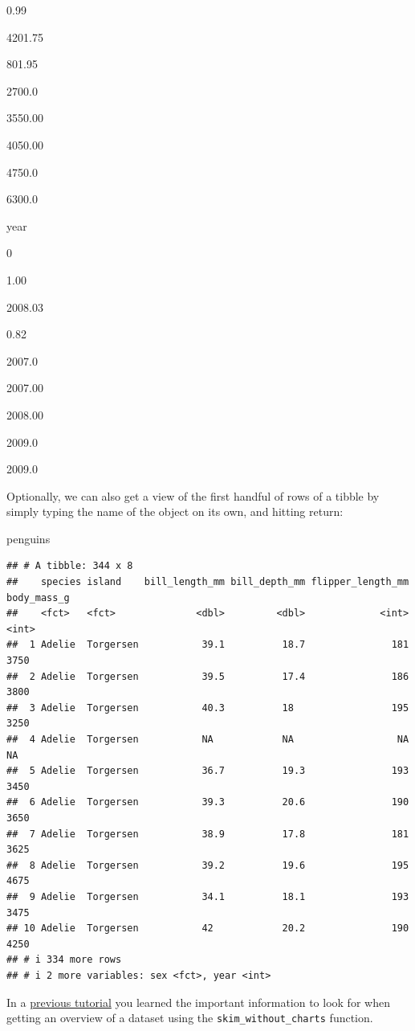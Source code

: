 \documentclass[
]{book}
\newenvironment{Shaded}{\begin{snugshade}}{\end{snugshade}}
\newcommand{\NormalTok}[1]{#1}
\begin{document}
0.99

4201.75

801.95

2700.0

3550.00

4050.00

4750.0

6300.0

year

0

1.00

2008.03

0.82

2007.0

2007.00

2008.00

2009.0

2009.0

Optionally, we can also get a view of the first handful of rows of a tibble by simply typing the name of the object on its own, and hitting return:

\begin{Shaded}
\begin{Highlighting}[]
\NormalTok{penguins }
\end{Highlighting}
\end{Shaded}

\begin{verbatim}
## # A tibble: 344 x 8
##    species island    bill_length_mm bill_depth_mm flipper_length_mm body_mass_g
##    <fct>   <fct>              <dbl>         <dbl>             <int>       <int>
##  1 Adelie  Torgersen           39.1          18.7               181        3750
##  2 Adelie  Torgersen           39.5          17.4               186        3800
##  3 Adelie  Torgersen           40.3          18                 195        3250
##  4 Adelie  Torgersen           NA            NA                  NA          NA
##  5 Adelie  Torgersen           36.7          19.3               193        3450
##  6 Adelie  Torgersen           39.3          20.6               190        3650
##  7 Adelie  Torgersen           38.9          17.8               181        3625
##  8 Adelie  Torgersen           39.2          19.6               195        4675
##  9 Adelie  Torgersen           34.1          18.1               193        3475
## 10 Adelie  Torgersen           42            20.2               190        4250
## # i 334 more rows
## # i 2 more variables: sex <fct>, year <int>
\end{verbatim}

In a \hyperref[data_overview]{previous tutorial} you learned the important information to look for when getting an overview of a dataset using the \texttt{skim\_without\_charts} function.
\end{document}
